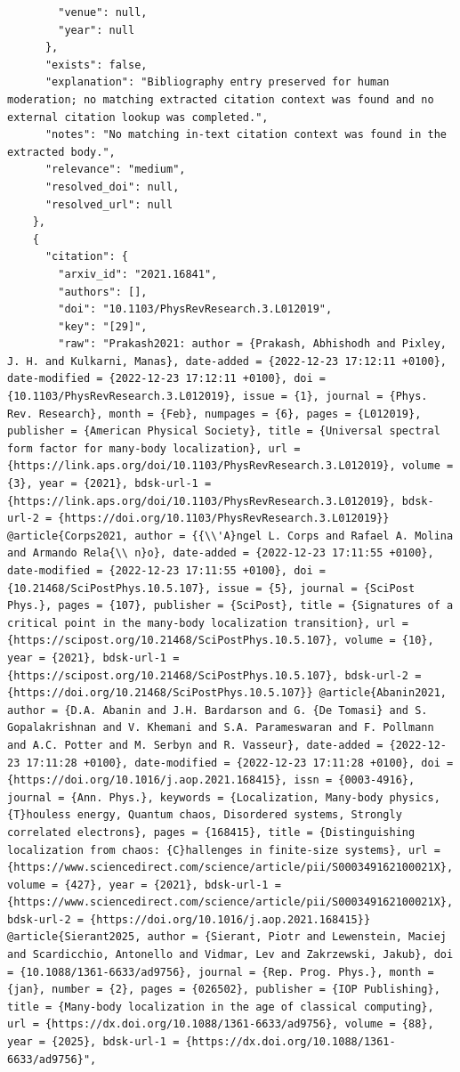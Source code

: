 \documentclass[11pt]{article}
\begin{document}
\begin{verbatim}
        "venue": null,
        "year": null
      },
      "exists": false,
      "explanation": "Bibliography entry preserved for human moderation; no matching extracted citation context was found and no external citation lookup was completed.",
      "notes": "No matching in-text citation context was found in the extracted body.",
      "relevance": "medium",
      "resolved_doi": null,
      "resolved_url": null
    },
    {
      "citation": {
        "arxiv_id": "2021.16841",
        "authors": [],
        "doi": "10.1103/PhysRevResearch.3.L012019",
        "key": "[29]",
        "raw": "Prakash2021: author = {Prakash, Abhishodh and Pixley, J. H. and Kulkarni, Manas}, date-added = {2022-12-23 17:12:11 +0100}, date-modified = {2022-12-23 17:12:11 +0100}, doi = {10.1103/PhysRevResearch.3.L012019}, issue = {1}, journal = {Phys. Rev. Research}, month = {Feb}, numpages = {6}, pages = {L012019}, publisher = {American Physical Society}, title = {Universal spectral form factor for many-body localization}, url = {https://link.aps.org/doi/10.1103/PhysRevResearch.3.L012019}, volume = {3}, year = {2021}, bdsk-url-1 = {https://link.aps.org/doi/10.1103/PhysRevResearch.3.L012019}, bdsk-url-2 = {https://doi.org/10.1103/PhysRevResearch.3.L012019}} @article{Corps2021, author = {{\\'A}ngel L. Corps and Rafael A. Molina and Armando Rela{\\ n}o}, date-added = {2022-12-23 17:11:55 +0100}, date-modified = {2022-12-23 17:11:55 +0100}, doi = {10.21468/SciPostPhys.10.5.107}, issue = {5}, journal = {SciPost Phys.}, pages = {107}, publisher = {SciPost}, title = {Signatures of a critical point in the many-body localization transition}, url = {https://scipost.org/10.21468/SciPostPhys.10.5.107}, volume = {10}, year = {2021}, bdsk-url-1 = {https://scipost.org/10.21468/SciPostPhys.10.5.107}, bdsk-url-2 = {https://doi.org/10.21468/SciPostPhys.10.5.107}} @article{Abanin2021, author = {D.A. Abanin and J.H. Bardarson and G. {De Tomasi} and S. Gopalakrishnan and V. Khemani and S.A. Parameswaran and F. Pollmann and A.C. Potter and M. Serbyn and R. Vasseur}, date-added = {2022-12-23 17:11:28 +0100}, date-modified = {2022-12-23 17:11:28 +0100}, doi = {https://doi.org/10.1016/j.aop.2021.168415}, issn = {0003-4916}, journal = {Ann. Phys.}, keywords = {Localization, Many-body physics, {T}houless energy, Quantum chaos, Disordered systems, Strongly correlated electrons}, pages = {168415}, title = {Distinguishing localization from chaos: {C}hallenges in finite-size systems}, url = {https://www.sciencedirect.com/science/article/pii/S000349162100021X}, volume = {427}, year = {2021}, bdsk-url-1 = {https://www.sciencedirect.com/science/article/pii/S000349162100021X}, bdsk-url-2 = {https://doi.org/10.1016/j.aop.2021.168415}} @article{Sierant2025, author = {Sierant, Piotr and Lewenstein, Maciej and Scardicchio, Antonello and Vidmar, Lev and Zakrzewski, Jakub}, doi = {10.1088/1361-6633/ad9756}, journal = {Rep. Prog. Phys.}, month = {jan}, number = {2}, pages = {026502}, publisher = {IOP Publishing}, title = {Many-body localization in the age of classical computing}, url = {https://dx.doi.org/10.1088/1361-6633/ad9756}, volume = {88}, year = {2025}, bdsk-url-1 = {https://dx.doi.org/10.1088/1361-6633/ad9756}",

\end{verbatim}
\end{document}
